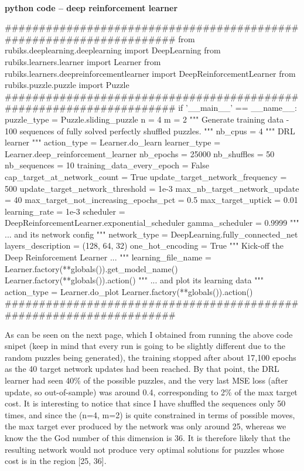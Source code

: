 \paragraph{}{\textbf{python code -- deep reinforcement learner}}
\begin{python}
####################################################################
from rubiks.deeplearning.deeplearning import DeepLearning
from rubiks.learners.learner import Learner
from rubiks.learners.deepreinforcementlearner import DeepReinforcementLearner
from rubiks.puzzle.puzzle import Puzzle
####################################################################
if '__main__' == __name__:
    puzzle_type = Puzzle.sliding_puzzle
    n = 4
    m = 2
    """ Generate training data - 100 sequences of fully 
    solved perfectly shuffled puzzles. 
    """
    nb_cpus = 4
    """ DRL learner """
    action_type = Learner.do_learn
    learner_type = Learner.deep_reinforcement_learner
    nb_epochs = 25000
    nb_shuffles = 50
    nb_sequences = 10
    training_data_every_epoch = False
    cap_target_at_network_count = True
    update_target_network_frequency = 500
    update_target_network_threshold = 1e-3
    max_nb_target_network_update = 40
    max_target_not_increasing_epochs_pct = 0.5
    max_target_uptick = 0.01
    learning_rate = 1e-3
    scheduler = DeepReinforcementLearner.exponential_scheduler
    gamma_scheduler = 0.9999
    """ ... and its network config """
    network_type = DeepLearning.fully_connected_net
    layers_description = (128, 64, 32)
    one_hot_encoding = True
    """ Kick-off the Deep Reinforcement Learner ... """
    learning_file_name = Learner.factory(**globals()).get_model_name()
    Learner.factory(**globals()).action()
    """ ... and plot its learning data """
    action_type = Learner.do_plot
    Learner.factory(**globals()).action()
####################################################################
\end{python}
\black
As can be seen on the next page, which I obtained from running the above code snipet (keep in mind that every run is going to be slightly different due to the random puzzles being generated), the training stopped after about 17,100 epochs as the 40 target network updates had been reached. By that point, the DRL learner had seen 40\% of the possible puzzles, and the very last MSE loss (after update, so out-of-sample) was around 0.4, corresponding to 2\% of the max target cost. It is interesting to notice that since I have shuffled the sequences only 50 times, and since the (n=4, m=2) is quite constrained in terms of possible moves, the max target ever produced by the network was only around 25, whereas we know the the God number of this dimension is 36. It is therefore likely that the resulting network would not produce very optimal solutions for puzzles whose cost is in the region [25, 36]. 


